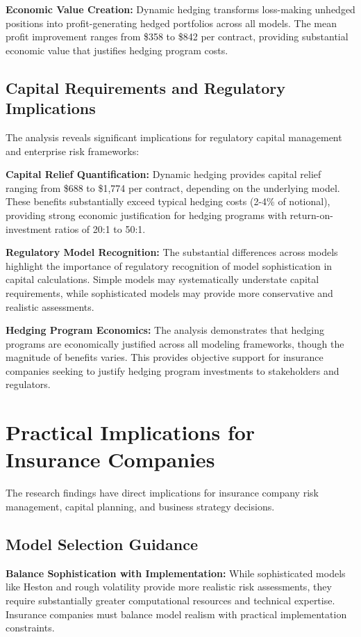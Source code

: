 \documentclass[12pt,a4paper]{report}
\begin{document}
\textbf{Economic Value Creation:} Dynamic hedging transforms loss-making unhedged positions into profit-generating hedged portfolios across all models. The mean profit improvement ranges from \$358 to \$842 per contract, providing substantial economic value that justifies hedging program costs.

\subsection{Capital Requirements and Regulatory Implications}

The analysis reveals significant implications for regulatory capital management and enterprise risk frameworks:

\textbf{Capital Relief Quantification:} Dynamic hedging provides capital relief ranging from \$688 to \$1,774 per contract, depending on the underlying model. These benefits substantially exceed typical hedging costs (2-4\% of notional), providing strong economic justification for hedging programs with return-on-investment ratios of 20:1 to 50:1.

\textbf{Regulatory Model Recognition:} The substantial differences across models highlight the importance of regulatory recognition of model sophistication in capital calculations. Simple models may systematically understate capital requirements, while sophisticated models may provide more conservative and realistic assessments.

\textbf{Hedging Program Economics:} The analysis demonstrates that hedging programs are economically justified across all modeling frameworks, though the magnitude of benefits varies. This provides objective support for insurance companies seeking to justify hedging program investments to stakeholders and regulators.

\section{Practical Implications for Insurance Companies}

The research findings have direct implications for insurance company risk management, capital planning, and business strategy decisions.

\subsection{Model Selection Guidance}

\textbf{Balance Sophistication with Implementation:} While sophisticated models like Heston and rough volatility provide more realistic risk assessments, they require substantially greater computational resources and technical expertise. Insurance companies must balance model realism with practical implementation constraints.
\end{document}
